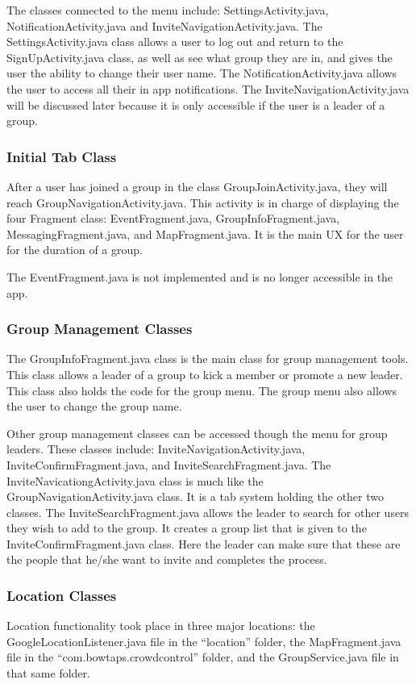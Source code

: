 	The classes connected to the menu include: SettingsActivity.java, NotificationActivity.java and InviteNavigationActivity.java.  The SettingsActivity.java class allows a user to log out and return to the SignUpActivity.java class, as well as see what group they are in, and gives the user the ability to change their user name. The NotificationActivity.java allows the user to access all their in app notifications. The InviteNavigationActivity.java will be discussed later because it is only accessible if the user is a leader of a group.
 	\subsubsection{Initial Tab Class}
 	After a user has joined a group in the class GroupJoinActivity.java, they will reach GroupNavigationActivity.java. This activity is in charge of displaying the four Fragment class: EventFragment.java, GroupInfoFragment.java, MessagingFragment.java, and MapFragment.java. It is the main UX for the user for the duration of a group.
 	
 	The EventFragment.java is not implemented and is no longer accessible in the app.
 	\subsubsection{Group Management Classes}
 	The GroupInfoFragment.java class is the main class for group management tools. This class allows a leader of a group to kick a member or promote a new leader. This class also holds the code for the group menu. The group menu also allows the user to change the group name.
 	
 	Other group management classes can be accessed though the menu for group leaders. These classes include: InviteNavigationActivity.java, InviteConfirmFragment.java, and InviteSearchFragment.java. The InviteNavicationgActivity.java class is much like the GroupNavigationActivity.java class. It is a tab system holding the other two classes. The InviteSearchFragment.java allows the leader to search for other users they wish to add to the group. It creates a group list that is given to the InviteConfirmFragment.java class. Here the leader can make sure that these are the people that he/she want to invite and completes the process.
 	\subsubsection{Location Classes}
 	Location functionality took place in three major locations: the GoogleLocationListener.java file in the ``location'' folder, the MapFragment.java file in the ``com.bowtaps.crowdcontrol'' folder, and the GroupService.java file in that same folder. 
 	
